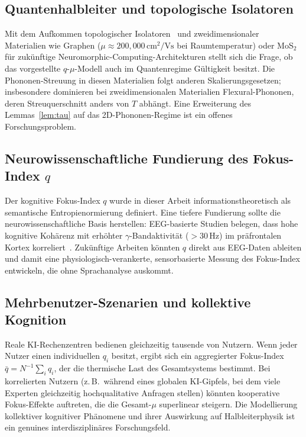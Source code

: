 ﻿\documentclass[a4paper,12pt]{article}
\theoremstyle{definition}
\begin{document}
\subsection{Quantenhalbleiter und topologische Isolatoren}

Mit dem Aufkommen topologischer Isolatoren~\cite{Hasan2010} und zweidimensionaler
Materialien wie Graphen ($\mu \approx 200{,}000\,\text{cm}^2/\text{Vs}$ bei Raumtemperatur)
oder MoS$_2$ für zukünftige Neuromorphic-Computing-Architekturen stellt sich die Frage,
ob das vorgestellte $q$-$\mu$-Modell auch im Quantenregime Gültigkeit besitzt. Die Phononen-Streuung
in diesen Materialien folgt anderen Skalierungsgesetzen; insbesondere dominieren bei
zweidimensionalen Materialien Flexural-Phononen, deren Streuquerschnitt anders von $T$ abhängt.
Eine Erweiterung des Lemmas~\ref{lem:tau} auf das 2D-Phononen-Regime ist ein offenes
Forschungsproblem.

\subsection{Neurowissenschaftliche Fundierung des Fokus-Index $q$}

Der kognitive Fokus-Index $q$ wurde in dieser Arbeit informationstheoretisch als
semantische Entropienormierung definiert. Eine tiefere Fundierung sollte die
neurowissenschaftliche Basis herstellen: EEG-basierte Studien belegen, dass hohe
kognitive Kohärenz mit erhöhter $\gamma$-Bandaktivität ($> 30\,\text{Hz}$) im
präfrontalen Kortex korreliert~\cite{Fries2005}. Zukünftige Arbeiten könnten
$q$ direkt aus EEG-Daten ableiten und damit eine physiologisch-verankerte,
sensorbasierte Messung des Fokus-Index entwickeln, die ohne Sprachanalyse auskommt.

\subsection{Mehrbenutzer-Szenarien und kollektive Kognition}

Reale KI-Rechenzentren bedienen gleichzeitig tausende von Nutzern. Wenn jeder Nutzer
einen individuellen $q_i$ besitzt, ergibt sich ein aggregierter Fokus-Index
$\bar{q} = N^{-1} \sum_i q_i$, der die thermische Last des Gesamtsystems bestimmt.
Bei korrelierten Nutzern (z.\,B.\ während eines globalen KI-Gipfels, bei dem viele
Experten gleichzeitig hochqualitative Anfragen stellen) könnten kooperative Fokus-Effekte
auftreten, die die Gesamt-$\mu$ superlinear steigern. Die Modellierung kollektiver
kognitiver Phänomene und ihrer Auswirkung auf Halbleiterphysik ist ein genuines
interdisziplinäres Forschungsfeld.
\end{document}
